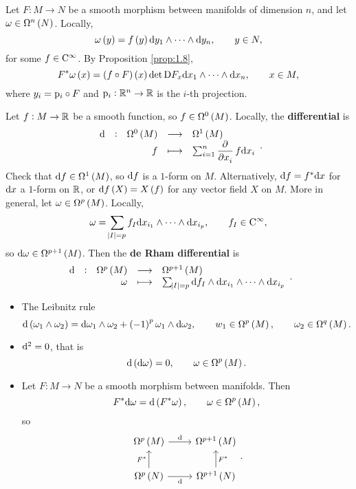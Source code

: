 \begin{example}
Let $ F : M \to N $ be a smooth morphism between manifolds of dimension $ n $, and let $ \omega \in \Omega^n\br{N} $. Locally,
$$ \omega\br{y} = f\br{y}\d y_1 \wedge \dots \wedge \d y_n, \qquad y \in N, $$
for some $ f \in \mathrm{C}^\infty $. By Proposition \ref{prop:1.8},
$$ F^*\omega\br{x} = \br{f \circ F}\br{x}\det \D F_x\d x_1 \wedge \dots \wedge \d x_n, \qquad x \in M, $$
where $ y_i = \mathrm{p}_i \circ F $ and $ \mathrm{p}_i : \mathbb{R}^n \to \mathbb{R} $ is the $ i $-th projection.
\end{example}

Let $ f : M \to \mathbb{R} $ be a smooth function, so $ f \in \Omega^0\br{M} $. Locally, the \textbf{differential} is
$$ \function[\d]{\Omega^0\br{M}}{\Omega^1\br{M}}{f}{\sum_{i = 1}^n \dpd{}{x_i}f\d x_i}. $$
Check that $ \d f \in \Omega^1\br{M} $, so $ \mathrm{d} f $ is a $ 1 $-form on $ M $. Alternatively, $ \mathrm{d} f = f^*\mathrm{d} x $ for $ \mathrm{d} x $ a $ 1 $-form on $ \mathbb{R} $, or $ \d f\br{X} = X\br{f} $ for any vector field $ X $ on $ M $. More in general, let $ \omega \in \Omega^p\br{M} $. Locally,
$$ \omega = \sum_{\abs{I} = p} f_I\mathrm{d} x_{i_1} \wedge \dots \wedge \mathrm{d} x_{i_p}, \qquad f_I \in \mathrm{C}^\infty, $$
so $ \d\omega \in \Omega^{p + 1}\br{M} $. Then the \textbf{de Rham differential} is
$$ \function[\d]{\Omega^p\br{M}}{\Omega^{p + 1}\br{M}}{\omega}{\sum_{\abs{I} = p} \d f_I \wedge \d x_{i_1} \wedge \dots \wedge \d x_{i_p}}. $$

\pagebreak

\begin{proposition}
\label{prop:1.16}
\hfill
\begin{itemize}
\item The Leibnitz rule
$$ \d\br{\omega_1 \wedge \omega_2} = \d\omega_1 \wedge \omega_2 + \br{-1}^p\omega_1 \wedge \d\omega_2, \qquad w_1 \in \Omega^p\br{M}, \qquad \omega_2 \in \Omega^q\br{M}. $$
\item $ \mathrm{d}^2 = 0 $, that is
$$ \d\br{\d\omega} = 0, \qquad \omega \in \Omega^p\br{M}. $$
\item Let $ F : M \to N $ be a smooth morphism between manifolds. Then
$$ F^*\d\omega = \d\br{F^*\omega}, \qquad \omega \in \Omega^p\br{M}, $$
so
$$
\begin{tikzcd}
\Omega^p\br{M} \arrow{r}{\d} & \Omega^{p + 1}\br{M} \\
\Omega^p\br{N} \arrow{u}{F^*} \arrow[swap]{r}{\d} & \Omega^{p + 1}\br{N} \arrow[swap]{u}{F^*}
\end{tikzcd}.
$$
\end{itemize}
\end{proposition}

